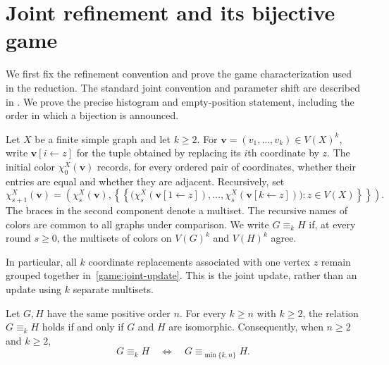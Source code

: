 \section{Joint refinement and its bijective game}
\label{game:section}

We first fix the refinement convention and prove the game characterization
used in the reduction.  The standard joint convention and parameter shift are described in
\citep[Section~2.2 and Theorem~1]{KieferNeuen2019}. We prove the precise
histogram and empty-position statement, including the order in which
a bijection is announced.

\begin{definition}
\label{def:joint-wl}
Let $X$ be a finite simple graph and let $k\geq 2$.  For
$\mathbf v=(v_1,\ldots,v_k)\in V(X)^k$, write
$\mathbf v[i\leftarrow z]$ for the tuple obtained by replacing its $i$th
coordinate by $z$.  The initial color $\chi_0^X(\mathbf v)$ records, for every
ordered pair of coordinates, whether their entries are equal and whether
they are adjacent.  Recursively, set
\begin{equation}
\label{game:joint-update}
 \chi_{s+1}^X(\mathbf v)=
 \left(\chi_s^X(\mathbf v),
 \left\{\!\!\left\{
 \bigl(\chi_s^X(\mathbf v[1\leftarrow z]),\ldots,
       \chi_s^X(\mathbf v[k\leftarrow z])\bigr):z\in V(X)
 \right\}\!\!\right\}\right).
\end{equation}
The braces in the second component denote a multiset.  The recursive names
of colors are common to all graphs under comparison.  We write
$G\equiv_k H$ if, at every round $s\geq 0$, the multisets of colors on
$V(G)^k$ and $V(H)^k$ agree.
\end{definition}

In particular, all $k$ coordinate replacements associated with one vertex
$z$ remain grouped together in~\eqref{game:joint-update}.  This is the joint
update, rather than an update using $k$ separate multisets.

\begin{lemma}
\label{lem:dimension-cap}
Let $G,H$ have the same positive order $n$.  For every $k\geq n$ with
$k\geq 2$, the relation $G\equiv_k H$ holds if and only if $G$ and $H$ are
isomorphic.  Consequently, when $n\geq 2$ and $k\geq 2$,
\[
 G\equiv_k H \quad\Longleftrightarrow\quad
 G\equiv_{\min\{k,n\}}H.
\]
\end{lemma}

